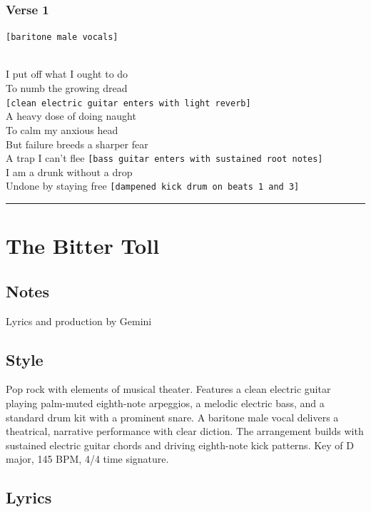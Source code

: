 \documentclass[]{article}
\begin{document}
\subsubsection{Verse 1}\label{verse-1-2}

\texttt{{[}baritone\ male\ vocals{]}}\strut \\
I put off what I ought to do\\
To numb the growing dread
\texttt{{[}clean\ electric\ guitar\ enters\ with\ light\ reverb{]}}\\
A heavy dose of doing naught\\
To calm my anxious head\\
But failure breeds a sharper fear\\
A trap I can't flee
\texttt{{[}bass\ guitar\ enters\ with\ sustained\ root\ notes{]}}\\
I am a drunk without a drop\\
Undone by staying free
\texttt{{[}dampened\ kick\ drum\ on\ beats\ 1\ and\ 3{]}}

\begin{center}\rule{0.5\linewidth}{0.5pt}\end{center}

\section{The Bitter Toll}\label{the-bitter-toll}

\subsection{Notes}\label{notes-8}

Lyrics and production by Gemini

\subsection{Style}\label{style-8}

Pop rock with elements of musical theater. Features a clean electric
guitar playing palm-muted eighth-note arpeggios, a melodic electric
bass, and a standard drum kit with a prominent snare. A baritone male
vocal delivers a theatrical, narrative performance with clear diction.
The arrangement builds with sustained electric guitar chords and driving
eighth-note kick patterns. Key of D major, 145 BPM, 4/4 time signature.

\subsection{Lyrics}\label{lyrics-8}
\end{document}
